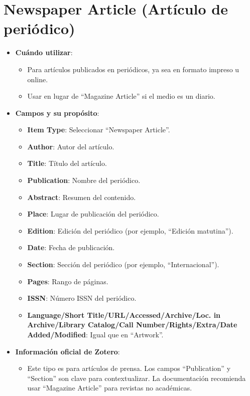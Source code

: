 \documentclass[
  jou,
  floatsintext,
  longtable,
  a4paper,
  nolmodern,
  notxfonts,
  notimes,
  12pt,
  colorlinks=true,linkcolor=blue,citecolor=blue,urlcolor=blue]{apa7}
\providecommand{\tightlist}{%
  \setlength{\itemsep}{0pt}\setlength{\parskip}{0pt}}
\begin{document}
\section{Newspaper Article (Artículo de
periódico)}\label{newspaper-article-artuxedculo-de-periuxf3dico}

\begin{itemize}
\tightlist
\item
  \textbf{Cuándo utilizar}:

  \begin{itemize}
  \tightlist
  \item
    Para artículos publicados en periódicos, ya sea en formato impreso u
    online.
  \item
    Usar en lugar de ``Magazine Article'' si el medio es un diario.
  \end{itemize}
\item
  \textbf{Campos y su propósito}:

  \begin{itemize}
  \tightlist
  \item
    \textbf{Item Type}: Seleccionar ``Newspaper Article''.
  \item
    \textbf{Author}: Autor del artículo.
  \item
    \textbf{Title}: Título del artículo.
  \item
    \textbf{Publication}: Nombre del periódico.
  \item
    \textbf{Abstract}: Resumen del contenido.
  \item
    \textbf{Place}: Lugar de publicación del periódico.
  \item
    \textbf{Edition}: Edición del periódico (por ejemplo, ``Edición
    matutina'').
  \item
    \textbf{Date}: Fecha de publicación.
  \item
    \textbf{Section}: Sección del periódico (por ejemplo,
    ``Internacional'').
  \item
    \textbf{Pages}: Rango de páginas.
  \item
    \textbf{ISSN}: Número ISSN del periódico.
  \item
    \textbf{Language/Short Title/URL/Accessed/Archive/Loc. in
    Archive/Library Catalog/Call Number/Rights/Extra/Date
    Added/Modified}: Igual que en ``Artwork''.
  \end{itemize}
\item
  \textbf{Información oficial de Zotero}:

  \begin{itemize}
  \tightlist
  \item
    Este tipo es para artículos de prensa. Los campos ``Publication'' y
    ``Section'' son clave para contextualizar. La documentación
    recomienda usar ``Magazine Article'' para revistas no académicas.
  \end{itemize}
\end{itemize}
\end{document}
